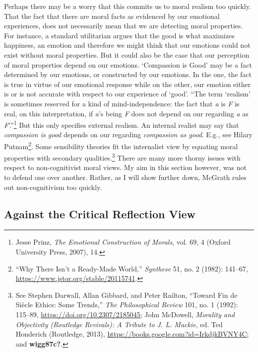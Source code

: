 \documentclass[phdthesis,12pt,final]{wuthesis}
\theoremstyle{definition}
\theoremstyle{definition}
\theoremstyle{definition}
\theoremstyle{definition}
\theoremstyle{remark}
\begin{document}
Perhaps there may be a worry that this commits us to moral realism too quickly. That the fact that there are moral facts as evidenced by our emotional experiences, does not necessarily mean that we are detecting moral properties. For instance, a standard utilitarian argues that the good is what maximizes happiness, an emotion and therefore we might think that our emotions could not exist without moral properties. But it could also be the case that our perception of moral properties depend on our emotions. `Compassion is Good' may be a fact determined by our emotions, or constructed by our emotions. In the one, the fact is true in virtue of our emotional response while on the other, our emotion either is or is not accurate with respect to our experience of `good'. ``The term `realism' is sometimes reserved for a kind of mind-independence: the fact that \emph{a} is \emph{F} is real, on this interpretation, if \emph{a}'s being \emph{F} does not depend on our regarding \emph{a} as \emph{F}'.''\footnote{Jesse Prinz, \emph{The {Emotional Construction} of {Morals}}, vol. 69, 4 (Oxford University Press, 2007), 14.} But this only specifies external realism. An internal realist may say that \emph{compassion is good} depends on our regarding \emph{compassion as good}. E.g., see Hilary Putnam\footnote{{``Why {There Isn}'t a {Ready-Made World},''} \emph{Synthese} 51, no. 2 (1982): 141--67, \url{https://www.jstor.org/stable/20115741}.}. Some sensibility theories fit the internalist view by equating moral properties with secondary qualities.\footnote{See Stephen Darwall, Allan Gibbard, and Peter Railton, {``Toward Fin de Siècle Ethics: Some Trends,''} \emph{The Philosophical Review} 101, no. 1 (1992): 115--89, \url{https://doi.org/10.2307/2185045}; John McDowell, \emph{Morality and {Objectivity} ({Routledge Revivals}): {A Tribute} to {J}. {L}. {Mackie}}, ed. Ted Honderich (Routledge, 2013), \url{https://books.google.com?id=IrkdjkBVNY4C}; and \textbf{wigg87c?}.} There are many more thorny issues with respect to non-cognitivist moral views. My aim in this section however, was not to defend one over another. Rather, as I will show further down, McGrath rules out non-cognitivism too quickly.

\subsection*{Against the Critical Reflection View}\label{against-the-critical-reflection-view}
\end{document}
